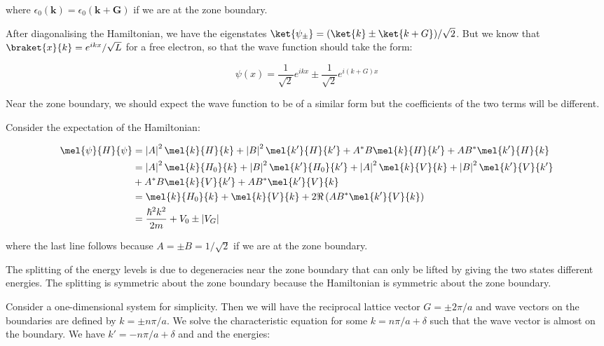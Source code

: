 \documentclass[12pt]{article}
\begin{document}
where $\epsilon_{0}(\mathbf{k}) = \epsilon_{0}(\mathbf{k} + \mathbf{G})$ if we are at the zone boundary.

After diagonalising the Hamiltonian, we have the eigenstates $\ket{\psi_{\pm}} = (\ket{k} \pm \ket{k + G})/\sqrt{2}$. But we know that $\braket{x}{k} = e^{ikx}/\sqrt{L}$ for a free electron, so that the wave function should take the form:

\begin{equation}
    \psi(x) = \frac{1}{\sqrt{2}} e^{ikx} \pm \frac{1}{\sqrt{2}} e^{i(k + G)x}
\end{equation}

Near the zone boundary, we should expect the wave function to be of a similar form but the coefficients of the two terms will be different.

Consider the expectation of the Hamiltonian:

\begin{equation}
    \begin{split}
        \mel{\psi}{H}{\psi} &= \left\lvert A \right\rvert^{2} \mel{k}{H}{k} + \left\lvert B \right\rvert^{2} \mel{k'}{H}{k'} + A^{*}B \mel{k}{H}{k'} + AB^{*} \mel{k'}{H}{k} \\
        &= \left\lvert A \right\rvert^{2} \mel{k}{H_{0}}{k} + \left\lvert B \right\rvert^{2} \mel{k'}{H_{0}}{k'} + \left\lvert A \right\rvert^{2} \mel{k}{V}{k} + \left\lvert B \right\rvert^{2} \mel{k'}{V}{k'} \\
        &+ A^{*}B \mel{k}{V}{k'} + AB^{*} \mel{k'}{V}{k} \\
        &= \mel{k}{H_{0}}{k} + \mel{k}{V}{k} + 2\Re\left(AB^{*} \mel{k'}{V}{k}\right) \\
        &= \frac{\hbar^{2}k^{2}}{2m} + V_{0} \pm \left\lvert V_{G} \right\rvert
    \end{split}
\end{equation}

where the last line follows because $A = \pm B = 1/\sqrt{2}$ if we are at the zone boundary.

The splitting of the energy levels is due to degeneracies near the zone boundary that can only be lifted by giving the two states different energies. The splitting is symmetric about the zone boundary because the Hamiltonian is symmetric about the zone boundary.

Consider a one-dimensional system for simplicity. Then we will have the reciprocal lattice vector $G = \pm 2\pi/a$ and wave vectors on the boundaries are defined by $k = \pm n\pi/a$. We solve the characteristic equation for some $k = n\pi/a + \delta$ such that the wave vector is almost on the boundary. We have $k' = -n\pi/a + \delta$ and and the energies:
\end{document}
